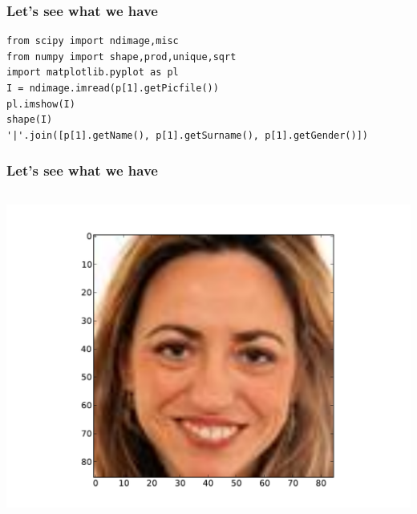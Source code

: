 \documentclass[10pt, colorlinks]{beamer}
\begin{document}
\begin{frame}[fragile]\frametitle{Let's see what we have}
\begin{verbatim}
from scipy import ndimage,misc
from numpy import shape,prod,unique,sqrt
import matplotlib.pyplot as pl
I = ndimage.imread(p[1].getPicfile())
pl.imshow(I)
shape(I)
'|'.join([p[1].getName(), p[1].getSurname(), p[1].getGender()])
\end{verbatim}

\end{frame}
\begin{frame}[fragile]\frametitle{Let's see what we have}
\begin{columns}
\includegraphics[width=\textwidth]{plwfigis/CursP_4_figure20}

\end{columns}

\end{frame}
\end{document}
